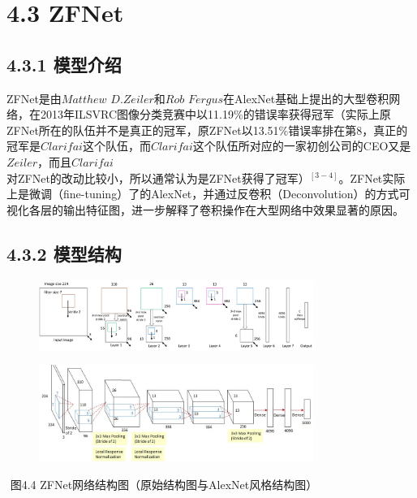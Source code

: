 \section{4.3 ZFNet}\label{zfnet}

\subsection{4.3.1 模型介绍}\label{ux6a21ux578bux4ecbux7ecd-2}

​ ZFNet是由\(Matthew\) \(D. Zeiler\)和\(Rob\)
\(Fergus\)在AlexNet基础上提出的大型卷积网络，在2013年ILSVRC图像分类竞赛中以11.19\%的错误率获得冠军（实际上原ZFNet所在的队伍并不是真正的冠军，原ZFNet以13.51\%错误率排在第8，真正的冠军是\(Clarifai\)这个队伍，而\(Clarifai\)这个队伍所对应的一家初创公司的CEO又是\(Zeiler\)，而且\(Clarifai\)对ZFNet的改动比较小，所以通常认为是ZFNet获得了冠军）\(^{[3-4]}​\)。ZFNet实际上是微调（fine-tuning）了的AlexNet，并通过反卷积（Deconvolution）的方式可视化各层的输出特征图，进一步解释了卷积操作在大型网络中效果显著的原因。

\subsection{4.3.2 模型结构}\label{ux6a21ux578bux7ed3ux6784-2}

\begin{figure}
\centering
\includegraphics[width=0.8\textwidth]{./img/ch4/image21.png}
\caption{}
\end{figure}

\begin{figure}
\centering
\includegraphics[width=0.8\textwidth]{./img/ch4/image21.jpeg}
\caption{}
\end{figure}

​ 图4.4 ZFNet网络结构图（原始结构图与AlexNet风格结构图）

